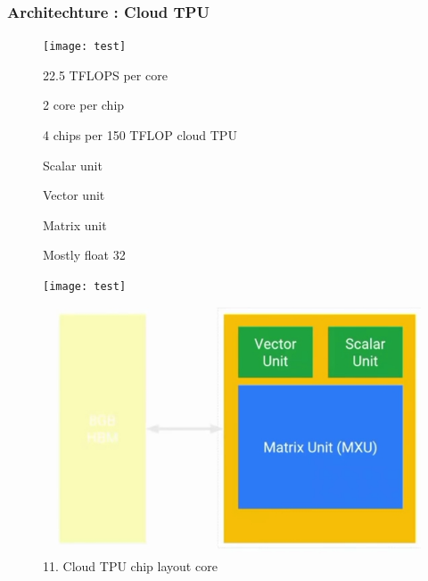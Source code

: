 \documentclass[c]{beamer}
\begin{document}
  \begin{frame} [c]
  \frametitle{Architechture : Cloud TPU}
			\begin{figure}[ht]
  {\begin{minipage}[t]{120pt}
    \texttt{[image: test]}
    	\begin{itemize}
		\justifying
		{\small \item22.5 TFLOPS per core
\item 2 core per chip
\item 4 chips per 150 TFLOP cloud TPU
\item Scalar unit
\item Vector unit
\item Matrix unit
\item Mostly float 32

	}

		\end{itemize}		
  \end{minipage}}
  \hfill
  {\begin{minipage}[t]{190pt}
    \texttt{[image: test]}
    
                \includegraphics[scale=.37]{images/11chiplayoutcore.png}
            \caption
            {11. Cloud TPU chip layout core}
            \label{fig: cloud TPU chip layout core}
        
  \end{minipage}}
\end{figure}
  \end{frame}
\end{document}
